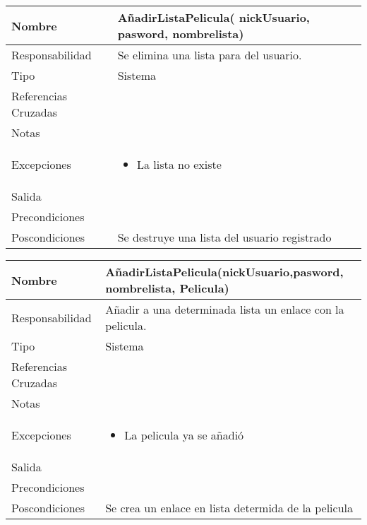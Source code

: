 \documentclass{article}
\begin{document}
\begin{table}[h]
\begin{tabular}{|l|l|l|l|l|l|}
\hline
\multicolumn{2}{|p{3cm}|}{Nombre} & \multicolumn{4}{p{10cm}|}{\textbf{AñadirListaPelicula( nickUsuario, pasword,  nombrelista)}}\\
\hline
\multicolumn{2}{|p{3cm}|}{Responsabilidad} & \multicolumn{4}{p{10cm}|}{Se elimina una lista para del usuario.} \\
\hline
\multicolumn{2}{|p{3cm}|}{Tipo} & \multicolumn{4}{p{10cm}|}{Sistema} \\
\hline
\multicolumn{2}{|p{3cm}|}{Referencias Cruzadas} & \multicolumn{4}{p{10cm}|}{} \\
\hline
\multicolumn{2}{|p{3cm}|}{Notas} & \multicolumn{4}{p{10cm}|}{} \\
\hline
\multicolumn{2}{|p{3cm}|}{Excepciones} & \multicolumn{4}{p{10cm}|}{\begin{itemize}
\item La lista no existe
\end{itemize}} \\
\hline
\multicolumn{2}{|p{3cm}|}{Salida} & \multicolumn{4}{p{10cm}|}{} \\
\hline
\multicolumn{2}{|p{3cm}|}{Precondiciones} & \multicolumn{4}{p{10cm}|}{} \\
\hline
\multicolumn{2}{|p{3cm}|}{Poscondiciones} & \multicolumn{4}{p{10cm}|}{Se destruye una lista del usuario registrado} \\
\hline
\end{tabular}
\end{table}

\begin{table}[h]
\begin{tabular}{|l|l|l|l|l|l|}
\hline
\multicolumn{2}{|p{3cm}|}{Nombre} & \multicolumn{4}{p{10cm}|}{\textbf{AñadirListaPelicula(nickUsuario,pasword, nombrelista, Pelicula)}}\\
\hline
\multicolumn{2}{|p{3cm}|}{Responsabilidad} & \multicolumn{4}{p{10cm}|}{Añadir a una determinada lista un enlace con la pelicula.} \\
\hline
\multicolumn{2}{|p{3cm}|}{Tipo} & \multicolumn{4}{p{10cm}|}{Sistema} \\
\hline
\multicolumn{2}{|p{3cm}|}{Referencias Cruzadas} & \multicolumn{4}{p{10cm}|}{} \\
\hline
\multicolumn{2}{|p{3cm}|}{Notas} & \multicolumn{4}{p{10cm}|}{} \\
\hline
\multicolumn{2}{|p{3cm}|}{Excepciones} & \multicolumn{4}{p{10cm}|}{\begin{itemize}
\item La pelicula ya se añadió
\end{itemize}} \\
\hline
\multicolumn{2}{|p{3cm}|}{Salida} & \multicolumn{4}{p{10cm}|}{} \\
\hline
\multicolumn{2}{|p{3cm}|}{Precondiciones} & \multicolumn{4}{p{10cm}|}{} \\
\hline
\multicolumn{2}{|p{3cm}|}{Poscondiciones} & \multicolumn{4}{p{10cm}|}{Se crea un enlace en lista determida de la pelicula} \\
\hline
\end{tabular}
\end{table}
\end{document}
